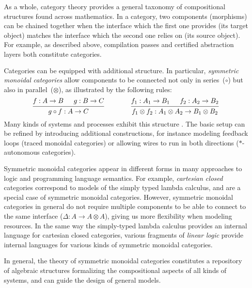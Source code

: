 \documentclass[11pt,oneside,draft]{book}
\theoremstyle{definition}
\begin{document}
As a whole,
category theory provides
a general taxonomy of
compositional structures found
across mathematics.
In a category,
two components (morphisms) can be chained together when
the interface which the first one provides
(its target object)
matches the interface which the second one relies on
(its source object).
For example,
as described above,
compilation passes and certified abstraction layers
both constitute categories.

Categories can be equipped with additional structure.
In particular,
\emph{symmetric monoidal categories}
allow components to be connected
not only in series~($\circ$)
but also in parallel~($\otimes$),
as illustrated by the following rules:
\[
  \begin{prooftree}
    \hypo{f : A \rightarrow B}
    \hypo{g : B \rightarrow C}
    \infer2{g \circ f : A \rightarrow C}
  \end{prooftree}
  \qquad
  \qquad
  \begin{prooftree}
    \hypo{f_1 : A_1 \rightarrow B_1}
    \hypo{f_2 : A_2 \rightarrow B_2}
    \infer2{f_1 \otimes f_2 : A_1 \otimes A_2 \rightarrow B_1 \otimes B_2}
  \end{prooftree}
\]
Many kinds of systems and processes
exhibit this structure \citep{rosetta}.
The basic setup can be refined by introducing additional constructions,
for instance modeling
feedback loops (traced monoidal categories) or allowing
wires to run in both directions
($*$-autonomous categories).

Symmetric monoidal categories appear in different forms
in many approaches to logic and programming language semantics.
For example,
\emph{cartesian closed} categories
correspond
to models of the simply typed lambda calculus,
and are a special case of symmetric monoidal categories.
However,
symmetric monoidal categories in general do not require
multiple components to be able to connect to the same interface
($\Delta : A \rightarrow A \otimes A$),
giving us more flexibility when modeling resources.
In the same way the simply-typed lambda calculus provides
an internal language for cartesian closed categories,
various fragments of \emph{linear logic} provide
internal languages for various kinds of symmetric monoidal categories.

In general,
the theory of symmetric monoidal categories
constitutes a repository of algebraic structures
formalizing the compositional aspects of
all kinds of systems,
and can guide the design
of general models.
\end{document}
